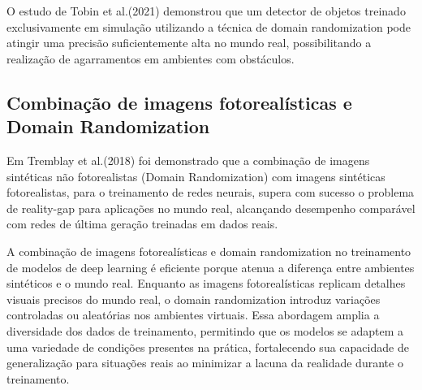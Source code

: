 O estudo de Tobin et al.(2021) demonstrou que um detector de objetos treinado exclusivamente em simulação utilizando a técnica de domain randomization pode atingir uma precisão suficientemente alta no mundo real, possibilitando a realização de agarramentos em ambientes com obstáculos. 

\subsection{Combinação de imagens fotorealísticas e Domain Randomization}

Em Tremblay et al.(2018) foi demonstrado que a combinação de imagens sintéticas não fotorealistas (Domain Randomization) com imagens sintéticas fotorealistas, para o treinamento de redes neurais, supera com sucesso o problema de reality-gap para aplicações no mundo real, alcançando desempenho comparável com redes de última geração treinadas em dados reais.

A combinação de imagens fotorealísticas e domain randomization no treinamento de modelos de deep learning é eficiente porque atenua a diferença entre ambientes sintéticos e o mundo real. Enquanto as imagens fotorealísticas replicam detalhes visuais precisos do mundo real, o domain randomization introduz variações controladas ou aleatórias nos ambientes virtuais. Essa abordagem amplia a diversidade dos dados de treinamento, permitindo que os modelos se adaptem a uma variedade de condições presentes na prática, fortalecendo sua capacidade de generalização para situações reais ao minimizar a lacuna da realidade durante o treinamento.

